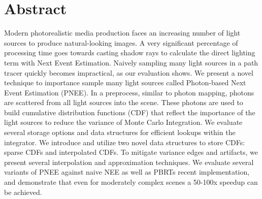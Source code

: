 \chapter*{Abstract}

Modern photorealistic media production faces an increasing number of light sources to produce natural-looking images. A very significant percentage of processing time goes towards casting shadow rays to calculate the direct lighting term with Next Event Estimation. Naively sampling many light sources in a path tracer quickly becomes impractical, as our evaluation shows. We present a novel technique to importance sample many light sources called Photon-based Next Event Estimation (PNEE). In a preprocess,  similar to photon mapping, photons are scattered from all light sources into the scene. These photons are used to build cumulative distribution functions (CDF) that reflect the importance of the light sources to reduce the variance of Monte Carlo Integration. We evaluate several storage options and data structures for efficient lookups within the integrator. We introduce and utilize two novel data structures to store CDFs: sparse CDFs and interpolated CDFs. To mitigate variance edges and artifacts, we present several interpolation and approximation techniques. We evaluate several variants of PNEE against naive NEE as well as PBRTs recent implementation, and demonstrate that even for moderately complex scenes a 50-100x speedup can be achieved.
